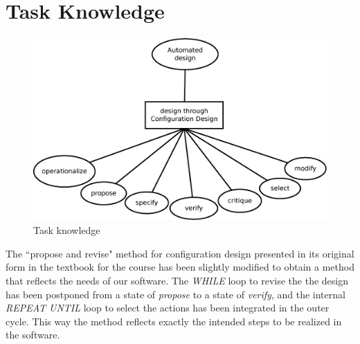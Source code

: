 \documentclass[11pt]{article} %
\begin{document}
\clearpage
\section{Task Knowledge}

\begin{figure}[h]
\centering
\includegraphics[height=7cm]{images/task_knowledge.eps}
\caption{Task knowledge}
\label{fig:taskknowledge}
\end{figure}

The ``propose and revise" method for configuration design presented in its original form in the textbook for the course has been slightly modified to obtain a method that reflects the needs of our software. The \textit{WHILE} loop to revise the the design has been postponed from a state of \textit{propose} to a state of \textit{verify}, and the internal \textit{REPEAT UNTIL} loop to select the actions has been integrated in the outer cycle. This way the method reflects exactly the intended steps to be realized in the software. 
\end{document}
